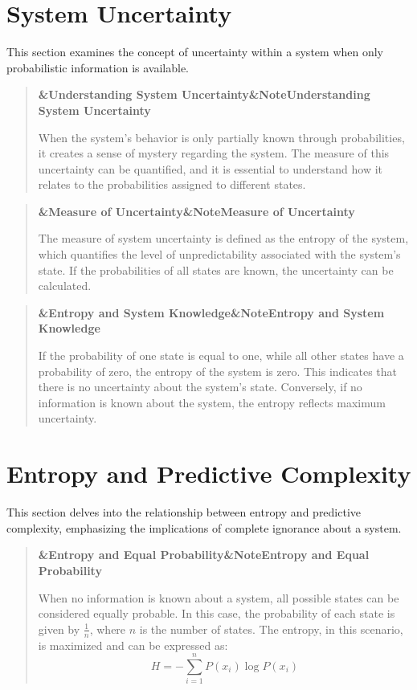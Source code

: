 \documentclass[a4paper]{article}
\newcommand{\boxheading}[1]{%
  \par\smallskip
  \noindent\textbf{\ifx&#1&Note\else#1\fi}\par
  \smallskip
}
\newenvironment{thmbox}[1][]{%
  \begin{quote}\color{blue!60!black}\boxheading{#1}\normalcolor
}{\end{quote}}
\newenvironment{defbox}[1][]{%
  \begin{quote}\color{green!40!black}\boxheading{#1}\normalcolor
}{\end{quote}}
\newenvironment{rembox}[1][]{%
  \begin{quote}\color{black!70}\boxheading{#1}\normalcolor
}{\end{quote}}
\begin{document}
\section{System Uncertainty}
This section examines the concept of uncertainty within a system when only probabilistic information is available.

\begin{rembox}[Understanding System Uncertainty]
When the system's behavior is only partially known through probabilities, it creates a sense of mystery regarding the system. The measure of this uncertainty can be quantified, and it is essential to understand how it relates to the probabilities assigned to different states.
\end{rembox}

\begin{defbox}[Measure of Uncertainty]
The measure of system uncertainty is defined as the entropy of the system, which quantifies the level of unpredictability associated with the system's state. If the probabilities of all states are known, the uncertainty can be calculated.
\end{defbox}

\begin{thmbox}[Entropy and System Knowledge]
If the probability of one state is equal to one, while all other states have a probability of zero, the entropy of the system is zero. This indicates that there is no uncertainty about the system's state. Conversely, if no information is known about the system, the entropy reflects maximum uncertainty.
\end{thmbox}

\section{Entropy and Predictive Complexity}
This section delves into the relationship between entropy and predictive complexity, emphasizing the implications of complete ignorance about a system.

\begin{rembox}[Entropy and Equal Probability]
When no information is known about a system, all possible states can be considered equally probable. In this case, the probability of each state is given by \( \frac{1}{n} \), where \( n \) is the number of states. The entropy, in this scenario, is maximized and can be expressed as:
\[
H = -\sum_{i=1}^{n} P(x_i) \log P(x_i)
\]
\end{rembox}
\end{document}
